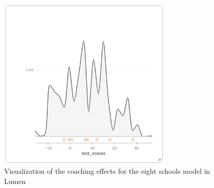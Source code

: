 \documentclass{article}
\begin{document}
\begin{figure}
	\centering
	\includegraphics[width=0.75\textwidth]{images/eight_schools_lumen_vis.png}
	\caption[Visualization of the coaching effects for the eight schools model in Lumen]{Visualization of the coaching effects for the eight schools model in Lumen}
	\label{fig:eightschools_lumen_vis}
\end{figure}

\end{document}
